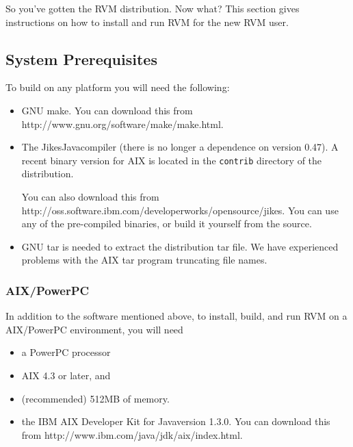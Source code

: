 So you've gotten the RVM distribution.  Now what?  This section gives
instructions on how to install and run RVM for the new RVM user.

\subsection{System Prerequisites}
To build on any platform you will need the following:
\begin{itemize}
\item GNU make. You can download this from
           {http://www.gnu.org/software/make/make.html}.

\item The Jikes\trademark Java\trademark compiler (there is no longer a dependence on
version 0.47). A recent binary version for AIX is located in the
{\tt contrib} directory of the distribution.

You can also download this from
           {http://oss.software.ibm.com/developerworks/opensource/jikes}.
You can use any of the pre-compiled binaries, or build it yourself from the
source.

\item GNU tar is needed to extract the distribution tar file.  We have
experienced problems with the AIX tar program truncating file names.

\end{itemize}

\subsubsection{AIX/PowerPC}
In addition to the software mentioned above, to install, build, and
run RVM on a AIX/PowerPC environment, 
you will need 
\begin{itemize}
\item a PowerPC processor
\item AIX 4.3 or later, and
\item (recommended) 512MB of memory.
\item the IBM AIX Developer Kit for Java\trademark version 1.3.0.  You can download this from
           {http://www.ibm.com/java/jdk/aix/index.html}.
\end{itemize}

